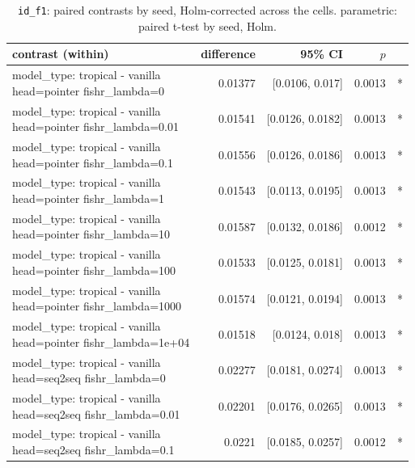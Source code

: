 \documentclass[10pt]{article}
\makeatletter
\newcommand{\stackcell}[1]{\begin{tabular}[t]{@{}l@{}}#1\end{tabular}}
\makeatother
\begin{document}
{\small
\begin{longtable}{lrrrl}
\caption{\texttt{id\_f1}: paired contrasts by seed, Holm-corrected across the cells. parametric: paired t-test by seed, Holm.}\label{tab:paired-id_f1}\\
\toprule
contrast (within) & difference & 95\% CI & $p$ & \\
\midrule
\endhead
\stackcell{model\_type: tropical - vanilla\\\footnotesize head=pointer fishr\_lambda=0 } & 0.01377 & [0.0106, 0.017] & 0.0013 & *\\
\stackcell{model\_type: tropical - vanilla\\\footnotesize head=pointer fishr\_lambda=0.01 } & 0.01541 & [0.0126, 0.0182] & 0.0013 & *\\
\stackcell{model\_type: tropical - vanilla\\\footnotesize head=pointer fishr\_lambda=0.1 } & 0.01556 & [0.0126, 0.0186] & 0.0013 & *\\
\stackcell{model\_type: tropical - vanilla\\\footnotesize head=pointer fishr\_lambda=1 } & 0.01543 & [0.0113, 0.0195] & 0.0013 & *\\
\stackcell{model\_type: tropical - vanilla\\\footnotesize head=pointer fishr\_lambda=10 } & 0.01587 & [0.0132, 0.0186] & 0.0012 & *\\
\stackcell{model\_type: tropical - vanilla\\\footnotesize head=pointer fishr\_lambda=100 } & 0.01533 & [0.0125, 0.0181] & 0.0013 & *\\
\stackcell{model\_type: tropical - vanilla\\\footnotesize head=pointer fishr\_lambda=1000 } & 0.01574 & [0.0121, 0.0194] & 0.0013 & *\\
\stackcell{model\_type: tropical - vanilla\\\footnotesize head=pointer fishr\_lambda=1e+04 } & 0.01518 & [0.0124, 0.018] & 0.0013 & *\\
\stackcell{model\_type: tropical - vanilla\\\footnotesize head=seq2seq fishr\_lambda=0 } & 0.02277 & [0.0181, 0.0274] & 0.0013 & *\\
\stackcell{model\_type: tropical - vanilla\\\footnotesize head=seq2seq fishr\_lambda=0.01 } & 0.02201 & [0.0176, 0.0265] & 0.0013 & *\\
\stackcell{model\_type: tropical - vanilla\\\footnotesize head=seq2seq fishr\_lambda=0.1 } & 0.0221 & [0.0185, 0.0257] & 0.0012 & *\\

\end{longtable}}
\end{document}
